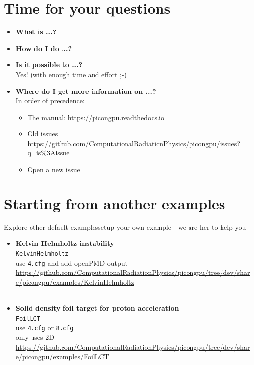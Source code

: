 \documentclass[
  aspectratio=169,
  10pt
]{beamer}
\begin{document}
\part{Time for your questions}
\frame{\partpage}
\begin{frame}[t,fragile]{}%
\begin{center}
    \large
\begin{itemize}
    \item \textbf{What is ...?}
    \item \textbf{How do I do ...?}
    \item \textbf{Is it possible to ...?}\\
        Yes! (with enough time and effort ;-)
    \item \textbf{Where do I get more information on ...?}\\
        In order of precedence:\\
        \begin{itemize}
            \item The manual: \url{https://picongpu.readthedocs.io}
            \item Old issues \url{https://github.com/ComputationalRadiationPhysics/picongpu/issues?q=is%3Aissue}
            \item Open a new issue
        \end{itemize}
\end{itemize}
\end{center}
\end{frame}


\part{Starting from another examples}
\frame{\partpage}

\begin{frame}[t,fragile]{Explore other default examples}{setup your own example - we are her to help you}

\begin{itemize}
    \item \textbf{Kelvin Helmholtz instability}\\
    \texttt{KelvinHelmholtz} \\
    use \texttt{4.cfg} and add openPMD output \\
    \url{https://github.com/ComputationalRadiationPhysics/picongpu/tree/dev/share/picongpu/examples/KelvinHelmholtz}\\
    $\,$
    \item \textbf{Solid density foil target for proton acceleration}\\
    \texttt{FoilLCT} \\
    use \texttt{4.cfg} or \texttt{8.cfg} \\
    only uses 2D \\
    \url{https://github.com/ComputationalRadiationPhysics/picongpu/tree/dev/share/picongpu/examples/FoilLCT}
\end{itemize}

\end{frame}
\end{document}
